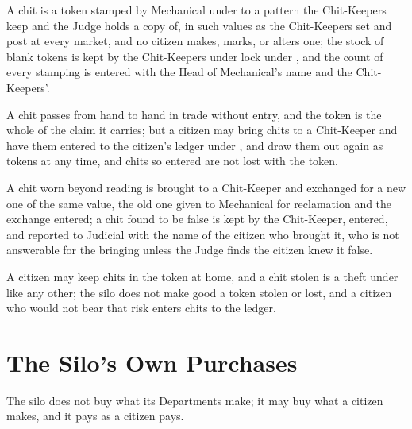 \begin{clauses}
\item A chit is a token stamped by Mechanical under  to a pattern the Chit-Keepers keep and the Judge holds a copy of, in such values as the Chit-Keepers set and post at every market, and no citizen makes, marks, or alters one; the stock of blank tokens is kept by the Chit-Keepers under lock under , and the count of every stamping is entered with the Head of Mechanical's name and the Chit-Keepers'.
\item A chit passes from hand to hand in trade without entry, and the token is the whole of the claim it carries; but a citizen may bring chits to a Chit-Keeper and have them entered to the citizen's ledger under , and draw them out again as tokens at any time, and chits so entered are not lost with the token.
\item A chit worn beyond reading is brought to a Chit-Keeper and exchanged for a new one of the same value, the old one given to Mechanical for reclamation and the exchange entered; a chit found to be false is kept by the Chit-Keeper, entered, and reported to Judicial with the name of the citizen who brought it, who is not answerable for the bringing unless the Judge finds the citizen knew it false.
\item A citizen may keep chits in the token at home, and a chit stolen is a theft under  like any other; the silo does not make good a token stolen or lost, and a citizen who would not bear that risk enters chits to the ledger.
\end{clauses}

\section{The Silo's Own Purchases}
\label{sec:commerce:silos-own-purchases}

The silo does not buy what its Departments make; it may buy what a citizen makes, and it pays as a citizen pays.

